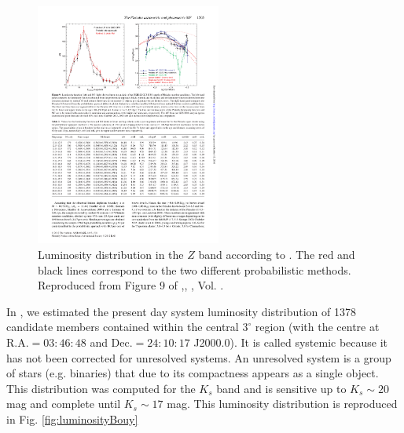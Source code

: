 \begin{figure}[ht!]
\begin{center}
\includegraphics[height=8cm]{background/Figures/F9_Lodieu2012.pdf}
\caption{Luminosity distribution  in the $Z$ band according to \citet{Lodieu2012}. The red and black lines correspond to the two different probabilistic methods.  Reproduced from Figure 9 of \citet{Lodieu2012},\textit{}, , Vol. .}
\label{fig:luminosityLodieu}
\end{center}
\end{figure}

In \citet{Bouy2015},  we estimated the present day system luminosity distribution of 1378 candidate members contained within the central $3^{\circ}$ region (with the centre at R.A.$=03:46:48$ and Dec.$=24:10:17$ J2000.0). It is called systemic because it has not been corrected for unresolved systems. An unresolved system is a group of stars (e.g. binaries) that due to its compactness appears as a single object. This distribution was computed for the $K_s$ band and is sensitive up to $K_s \sim 20$ mag and complete until $K_s \sim 17$ mag. This luminosity distribution is reproduced in Fig. \ref{fig:luminosityBouy}


